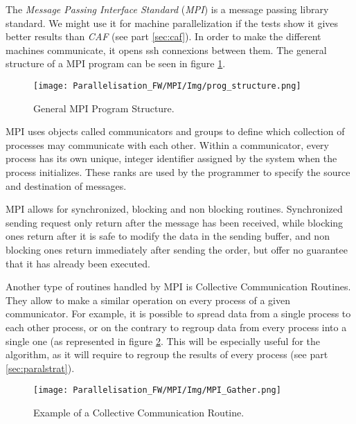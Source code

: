 The \emph{Message Passing Interface Standard} (\emph{MPI}) is a message passing library standard.
We might use it for machine parallelization if the tests show it gives better results than \emph{CAF} (see part \ref{sec:caf}).
In order to make the different machines communicate, it opens ssh connexions between them.
The general structure of a MPI program can be seen in figure \ref{fig:mpi_struct}.

\begin{figure}[!h]
\centering
\texttt{[image: Parallelisation\_FW/MPI/Img/prog\_structure.png]}
\caption{General MPI Program Structure. \cite{mpi_tuto}}
\label{fig:mpi_struct}
\end{figure}

MPI uses objects called communicators and groups to define which collection of processes may communicate with each other.
Within a communicator, every process has its own unique, integer identifier assigned by the system when the process initializes.
These ranks are used by the programmer to specify the source and destination of messages.

MPI allows for synchronized, blocking and non blocking routines.
Synchronized sending request only return after the message has been received, while blocking ones return after it is safe to modify the data in the sending buffer, and non blocking ones return immediately after sending the order, but offer no guarantee that it has already been executed.

Another type of routines handled by MPI is Collective Communication Routines.
They allow to make a similar operation on every process of a given communicator.
For example, it is possible to spread data from a single process to each other process, or on the contrary to regroup data from every process into a single one (as represented in figure \ref{fig:mpi_ccr}.
This will be especially useful for the algorithm, as it will require to regroup the results of every process (see part \ref{sec:paralstrat}).

\begin{figure}[!h]
\centering
\texttt{[image: Parallelisation\_FW/MPI/Img/MPI\_Gather.png]}
\caption{Example of a Collective Communication Routine. \cite{mpi_tuto}}
\label{fig:mpi_ccr}
\end{figure}